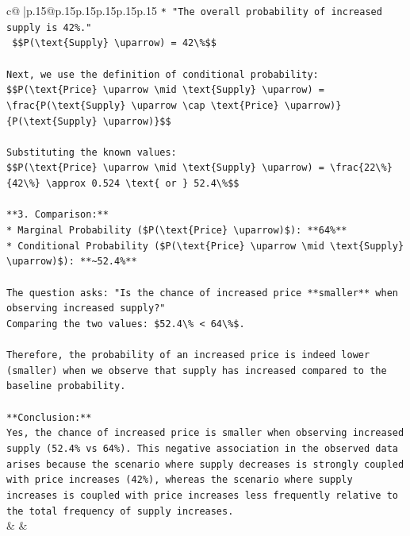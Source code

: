 \documentclass{article}
\begin{document}
{\begin{supertabular}{c@{$\;$}|p{.15\linewidth}@{}p{.15\linewidth}p{.15\linewidth}p{.15\linewidth}p{.15\linewidth}p{.15\linewidth}}
{{{\texttt{*   "The overall probability of increased supply is 42\%."} \\
\texttt{    \$\$P(\textbackslash{}text\{Supply\} \textbackslash{}uparrow) = 42\textbackslash{}\%\$\$} \\
\\ 
\texttt{Next, we use the definition of conditional probability:} \\
\texttt{\$\$P(\textbackslash{}text\{Price\} \textbackslash{}uparrow \textbackslash{}mid \textbackslash{}text\{Supply\} \textbackslash{}uparrow) = \textbackslash{}frac\{P(\textbackslash{}text\{Supply\} \textbackslash{}uparrow \textbackslash{}cap \textbackslash{}text\{Price\} \textbackslash{}uparrow)\}\{P(\textbackslash{}text\{Supply\} \textbackslash{}uparrow)\}\$\$} \\
\\ 
\texttt{Substituting the known values:} \\
\texttt{\$\$P(\textbackslash{}text\{Price\} \textbackslash{}uparrow \textbackslash{}mid \textbackslash{}text\{Supply\} \textbackslash{}uparrow) = \textbackslash{}frac\{22\textbackslash{}\%\}\{42\textbackslash{}\%\} \textbackslash{}approx 0.524 \textbackslash{}text\{ or \} 52.4\textbackslash{}\%\$\$} \\
\\ 
\texttt{**3. Comparison:**} \\
\texttt{*   Marginal Probability (\$P(\textbackslash{}text\{Price\} \textbackslash{}uparrow)\$): **64\%**} \\
\texttt{*   Conditional Probability (\$P(\textbackslash{}text\{Price\} \textbackslash{}uparrow \textbackslash{}mid \textbackslash{}text\{Supply\} \textbackslash{}uparrow)\$): **\textasciitilde{}52.4\%**} \\
\\ 
\texttt{The question asks: "Is the chance of increased price **smaller** when observing increased supply?"} \\
\texttt{Comparing the two values: \$52.4\textbackslash{}\% < 64\textbackslash{}\%\$.} \\
\\ 
\texttt{Therefore, the probability of an increased price is indeed lower (smaller) when we observe that supply has increased compared to the baseline probability.} \\
\\ 
\texttt{**Conclusion:**} \\
\texttt{Yes, the chance of increased price is smaller when observing increased supply (52.4\% vs 64\%). This negative association in the observed data arises because the scenario where supply decreases is strongly coupled with price increases (42\%), whereas the scenario where supply increases is coupled with price increases less frequently relative to the total frequency of supply increases.} \\
            }
        }
    }
    & & \\ \\


\end{supertabular}}
\end{document}
